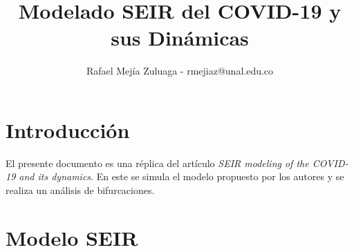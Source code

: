 \documentclass[conference]{IEEEtran}
\begin{document}
    

\title{Modelado SEIR del COVID-19 y sus Dinámicas}

\author{Rafael Mejía Zuluaga - rmejiaz@unal.edu.co}

\maketitle


\section{Introducción}

El presente documento es una réplica del artículo \textit{SEIR modeling of the
COVID-19 and its dynamics}. En este se simula el modelo propuesto por los autores 
y se realiza un análisis de bifurcaciones.

\section{Modelo SEIR}
\end{document}

